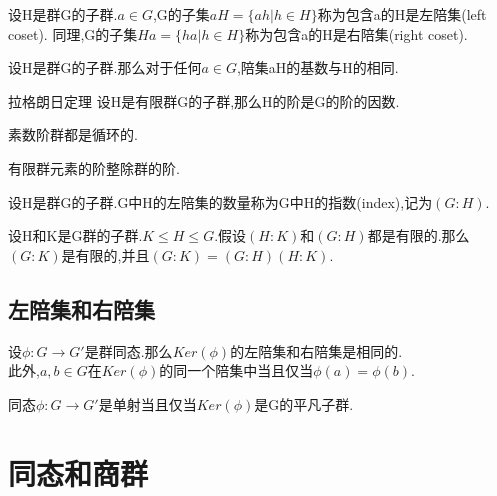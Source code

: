 \documentclass[oneside,openany]{ctexbook}
\begin{document}
\begin{definition}{}{}
设H是群G的子群.$a\in G$,G的子集$aH=\{ah|h\in H\}$称为包含a的H是左陪集(left coset).
同理,G的子集$Ha=\{ha|h\in H\}$称为包含a的H是右陪集(right coset).
\end{definition}

\begin{definition}{}{}
设H是群G的子群.那么对于任何$a\in G$,陪集aH的基数与H的相同.
\end{definition}

\begin{definition}{拉格朗日定理}{}
设H是有限群G的子群,那么H的阶是G的阶的因数.
\end{definition}

\begin{definition}{}{}
素数阶群都是循环的.
\end{definition}

\begin{definition}{}{}
有限群元素的阶整除群的阶.
\end{definition}

\begin{definition}{}{}
设H是群G的子群.G中H的左陪集的数量称为G中H的指数(index),记为$(G:H)$.
\end{definition}

\begin{definition}{}{}
设H和K是G群的子群.$K\leq H\leq G$.假设$(H:K)$和$(G:H)$都是有限的.那么$(G:K)$是有限的,并且$(G:K)=(G:H)(H:K)$.
\end{definition}

\section{左陪集和右陪集}

\begin{definition}{}{}
设$\phi :G\rightarrow G'$是群同态.那么$Ker(\phi)$的左陪集和右陪集是相同的.\\
此外,$a,b\in G$在$Ker(\phi)$的同一个陪集中当且仅当$\phi(a)=\phi(b)$.
\end{definition}

\begin{definition}{}{}
同态$\phi :G\rightarrow G'$是单射当且仅当$Ker(\phi)$是G的平凡子群.
\end{definition}

\chapter{同态和商群}
\end{document}
